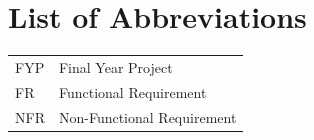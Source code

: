 \chapter*{List of Abbreviations}
\begin{tabular}{ll}
FYP & Final Year Project\\
FR & Functional Requirement\\
NFR & Non-Functional Requirement\\
\end{tabular}
